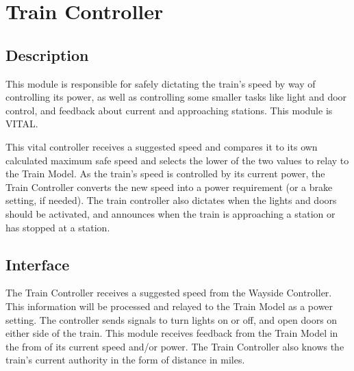 \documentclass{scrreprt}
\begin{document}
\section{Train Controller}

\subsection{Description}
This module is responsible for safely dictating the train's speed by way of controlling its power, as well as controlling some smaller tasks like light and door control, and feedback about current and approaching stations. This module is VITAL.

This vital controller receives a suggested speed and compares it to its own calculated maximum safe speed and selects the lower of the two values to relay to the Train Model. As the train's speed is controlled by its current power, the Train Controller converts the new speed into a power requirement (or a brake setting, if needed).  The train controller also dictates when the lights and doors should be activated, and announces when the train is approaching a station or has stopped at a station.

\subsection{Interface}
The Train Controller receives a suggested speed from the Wayside Controller. This information will be processed and relayed to the Train Model as a power setting.  The controller sends signals to turn lights on or off, and open doors on either side of the train.  This module receives feedback from the Train Model in the from of its current speed and/or power.  The Train Controller also knows the train's current authority in the form of distance in miles.
\end{document}
